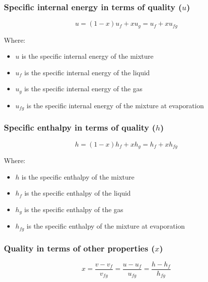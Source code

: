 \documentclass[11pt]{article}
\begin{document}
\newpage
\subsubsection{Specific internal energy in terms of quality (\(u\))}
\label{sec:orgf778bcf}
\[u = (1 - x) u_f + xu_g = u_f + x u_{fg}\]

Where:
\begin{itemize}
\item \(u\) is the specific internal energy of the mixture
\item \(u_f\) is the specific internal energy of the liquid
\item \(u_g\) is the specific internal energy of the gas
\item \(u_{fg}\) is the specific internal energy of the mixture at evaporation
\end{itemize}
\subsubsection{Specific enthalpy in terms of quality (\(h\))}
\label{sec:org22bfae3}
\[h = (1 - x) h_f + xh_g = h_f + x h_{fg}\]

Where:
\begin{itemize}
\item \(h\) is the specific enthalpy of the mixture
\item \(h_f\) is the specific enthalpy of the liquid
\item \(h_g\) is the specific enthalpy of the gas
\item \(h_{fg}\) is the specific enthalpy of the mixture at evaporation
\end{itemize}

\newpage
\subsubsection{Quality in terms of other properties (\(x\))}
\label{sec:orge91d672}
\[x = \frac{v - v_f}{v_{fg}} = \frac{u - u_f}{u_{fg}} = \frac{h - h_f}{h_{fg}}\]
\end{document}
